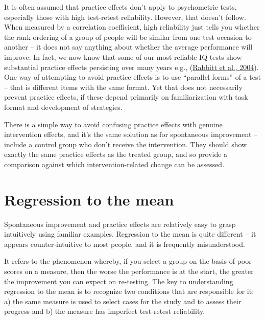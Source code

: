 \documentclass{krantz}
\begin{document}
It is often assumed that practice effects don't apply to psychometric tests, especially those with high test-retest reliability. However, that doesn't follow. When measured by a correlation coefficient, high reliability just tells you whether the rank ordering of a group of people will be similar from one test occasion to another -- it does not say anything about whether the average performance will improve. In fact, we now know that some of our most reliable IQ tests show substantial practice effects persisting over many years e.g., (\protect\hyperlink{ref-rabbitt2004}{Rabbitt et al., 2004}). One way of attempting to avoid practice effects is to use ``parallel forms'' of a test -- that is different items with the same format. Yet that does not necessarily prevent practice effects, if these depend primarily on familiarization with task format and development of strategies.

There is a simple way to avoid confusing practice effects with genuine intervention effects, and it's the same solution as for spontaneous improvement -- include a control group who don't receive the intervention. They should show exactly the same practice effects as the treated group, and so provide a comparison against which intervention-related change can be assessed.

\hypertarget{regression-to-the-mean}{%
\section{Regression to the mean}\label{regression-to-the-mean}}

Spontaneous improvement and practice effects are relatively easy to grasp intuitively using familiar examples. Regression to the mean is quite different -- it appears counter-intuitive to most people, and it is frequently misunderstood.

It refers to the phenomenon whereby, if you select a group on the basis of poor scores on a measure, then the worse the performance is at the start, the greater the improvement you can expect on re-testing. The key to understanding regression to the mean is to recognize two conditions that are responsible for it: a) the same measure is used to select cases for the study and to assess their progress and b) the measure has imperfect test-retest reliability.
\end{document}

